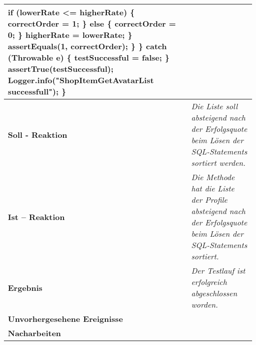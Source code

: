 \begin{longtable}{|p{4cm}|p{11cm}|}
{\hspace*{12mm}                if (lowerRate <= higherRate) \{ \newline
\hspace*{15mm}                    correctOrder = 1; \newline
\hspace*{12mm}                \} else \{ \newline
\hspace*{15mm}                    correctOrder = 0; \newline
\hspace*{12mm}                \} \newline
\hspace*{12mm}                higherRate = lowerRate; \newline
\hspace*{9mm}            \} \newline
\hspace*{9mm}            assertEquals(1, correctOrder); \newline
\hspace*{6mm}        \} \newline
\hspace*{3mm}    \} catch (Throwable e) \{ \newline
\hspace*{6mm}        testSuccessful = false; \newline
\hspace*{3mm}    \} \newline
\hspace*{3mm}    assertTrue(testSuccessful); \newline
\hspace*{3mm}    Logger.info("ShopItemGetAvatarList successfull"); \newline
\} \newline
} \\
\hline
\textbf{Soll - Reaktion} & \textit{Die Liste soll absteigend nach der Erfolgsquote beim Lösen der SQL-Statements sortiert werden.} \\
\hline
\textbf{Ist -- Reaktion} & \textit{Die Methode hat die Liste der Profile absteigend nach der Erfolgsquote beim Lösen der SQL-Statements sortiert.} \\
\hline
\textbf{Ergebnis} & \textit{Der Testlauf ist erfolgreich abgeschlossen worden.} \\
\hline
\textbf{Unvorhergesehene Ereignisse} &
\textit{} \\
\hline
\textbf{Nacharbeiten } & \textit{} \\
\hline
\end{longtable}

